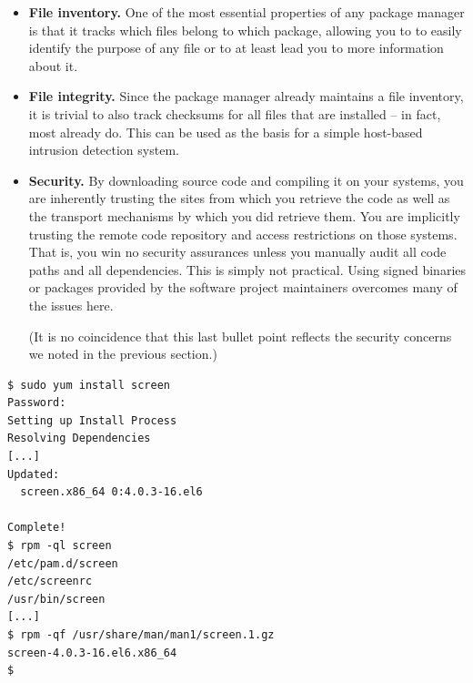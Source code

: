 \begin{itemize}
	\item {\bf File inventory.}  One of the most essential properties
		of any package manager is that it tracks which files belong
		to which package, allowing you to to easily identify the
		purpose of any file or to at least lead you to more
		information about it.

	\item {\bf File integrity.}  Since the package manager already
		maintains a file inventory, it is trivial to also track
		checksums for all files that are installed -- in fact,
		most already do.  This can be used as the basis for a
		simple host-based intrusion detection system.

	\item {\bf Security.}  By downloading source
		code and compiling it on your systems, you are
		inherently trusting the sites from which you retrieve
		the code as well as the transport mechanisms by which
		you did retrieve them.  You are implicitly trusting
		the remote code repository and access restrictions on
		those systems.  That is, you win no security
		assurances unless you manually audit all code paths
		and all dependencies.  This is simply not practical.
		Using signed binaries or packages
		provided by the software project maintainers overcomes
		many of the issues here.

		(It is no coincidence that this last bullet point
		reflects the security concerns we noted in the
		previous section.)

\end{itemize}

\begin{lstlisting}[float,label=code:rpm,caption={[{\em
rpm}/{\em yum} sample commands]Example invocations of
the {\em rpm}/{\em yum} package manager to add a
package, list its files and identify the name of a
package a given file belongs to.}]
$ sudo yum install screen
Password:
Setting up Install Process
Resolving Dependencies
[...]
Updated:
  screen.x86_64 0:4.0.3-16.el6

Complete!
$ rpm -ql screen
/etc/pam.d/screen
/etc/screenrc
/usr/bin/screen
[...]
$ rpm -qf /usr/share/man/man1/screen.1.gz
screen-4.0.3-16.el6.x86_64
$ 
\end{lstlisting}


